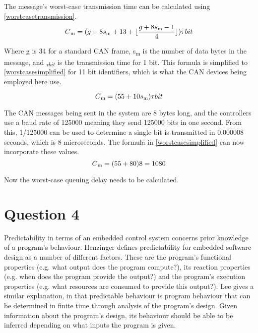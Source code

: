 \documentclass[]{report}
\begin{document}
		The message's worst-case transmission time can be calculated using \ref{worstcasetransmission}.
		\begin{equation}
		\label{worstcasetransmission}
		C\textsubscript{m} = (g + 8s\textsubscript{m} + 13 + \lfloor \frac{g + 8s\textsubscript{m} - 1}{4} \rfloor ) \tau bit
		\end{equation}
		
		Where g is 34 for a standard CAN frame, s\textsubscript{m} is the number of data bytes in the message, and \textsubscript{$\tau bit$} is the transmission time for 1 bit. This formula is simplified to \ref{worstcasesimplified} for 11 bit identifiers, which is what the CAN devices being employed here use.
		
		\begin{equation}
		\label{worstcasesimplified}
		C\textsubscript{m} = (55 + 10s\textsubscript{m})\tau bit
		\end{equation}
		
		The CAN messages being sent in the system are 8 bytes long, and the controllers use a baud rate of 125000 meaning they send 125000 bits in one second. From this, 1/125000 can be used to determine a single bit is transmitted in 0.000008 seconds, which is 8 microseconds. The formula in \ref{worstcasesimplified} can now incorporate these values.
		\begin{equation}
		\label{worstcasesimplifiedrealnumbers}
		C\textsubscript{m} = (55 + 80)8 = 1080
		\end{equation}
		\medskip
		
		Now the worst-case queuing delay needs to be calculated. 
		
		\section{Question 4}
		Predictability in terms of an embedded control system concerns prior knowledge of a program's behaviour. Henzinger\cite{henzinger2008two} defines predictability for embedded software design as a number of different factors. These are the program's functional properties (e.g. what output does the program compute?), its reaction properties (e.g. when does the program provide the output?) and the program's execution properties (e.g. what resources are consumed to provide this output?). Lee\cite{Lee:EECS-2009-30} gives a similar explanation, in that predictable behaviour is program behaviour that can be determined in finite time through analysis of the program's design. Given information about the program's design, its behaviour should be able to be inferred depending on what inputs the program is given.
		\medskip
		
\end{document}
